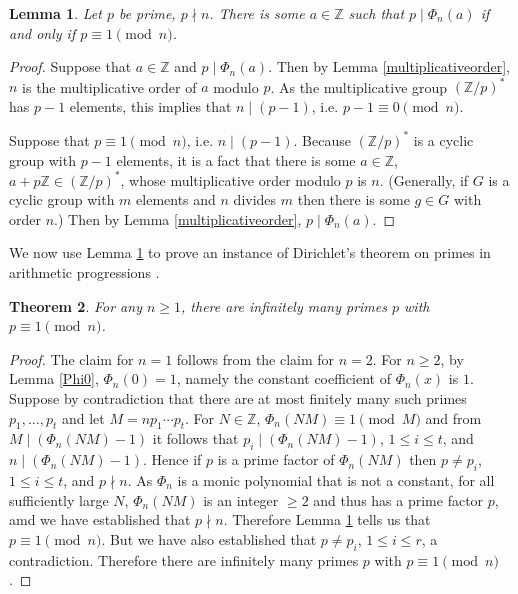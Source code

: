\documentclass{amsart}
\newtheorem{theorem}{Theorem}
\newtheorem{lemma}[theorem]{Lemma}
\theoremstyle{definition}
\begin{document}
\begin{lemma}
Let $p$ be prime, $p \nmid n$. There is some $a \in \mathbb{Z}$ such that $p \mid \Phi_n(a)$ if and only if
$p \equiv 1 \pmod{n}$. 
\label{aPhi}
\end{lemma}
\begin{proof}
Suppose that $a \in \mathbb{Z}$ and $p \mid \Phi_n(a)$. Then by Lemma \ref{multiplicativeorder},
$n$ is the multiplicative order of $a$ modulo $p$. As the multiplicative group
$(\mathbb{Z}/p)^*$ has $p-1$ elements, this implies that $n \mid (p-1)$, i.e. $p-1 \equiv 0 \pmod{n}$.

Suppose that $p \equiv 1 \pmod{n}$, i.e. $n \mid (p-1)$. 
Because $(\mathbb{Z}/p)^*$ is a cyclic group with $p-1$ elements, it is a fact that 
there is some $a \in \mathbb{Z}$, $a+p\mathbb{Z} \in (\mathbb{Z}/p)^*$, whose multiplicative order modulo
$p$ is $n$. (Generally, if $G$ is a cyclic group with $m$ elements and $n$ divides $m$ then there is some
$g \in G$ with order $n$.) Then by Lemma \ref{multiplicativeorder}, $p \mid \Phi_n(a)$.
\end{proof}


We now use Lemma \ref{aPhi} to prove an instance of Dirichlet's theorem on primes in arithmetic progressions \cite[p.~13, Lemma 2.9]{washington}.


\begin{theorem}
For any $n \geq 1$, there are infinitely many primes $p$ with $p \equiv 1 \pmod{n}$.
\end{theorem}
\begin{proof}
The claim for $n=1$ follows from the claim for $n=2$. 
For $n \geq 2$, by Lemma \ref{Phi0}, $\Phi_n(0)=1$, namely the constant coefficient of $\Phi_n(x)$ is $1$. 
Suppose by contradiction that there are at most finitely many such primes $p_1,\ldots,p_t$
and let $M = np_1\cdots p_t$. For $N \in \mathbb{Z}$, $\Phi_n(NM) \equiv 1 \pmod{M}$ and
from $M \mid (\Phi_n(NM) - 1)$ it follows that $p_i \mid (\Phi_n(NM)-1)$, $1 \leq i \leq t$, and
$n \mid (\Phi_n(NM)-1)$. Hence if $p$ is a prime factor
of $\Phi_n(NM)$ then $p \neq p_i$, $1 \leq i \leq t$, and $p \nmid n$.
As $\Phi_n$ is a  monic polynomial that is not a constant,
for all sufficiently large $N$, $\Phi_n(NM)$ is an integer $\geq 2$ and thus has a prime factor $p$, amd we have
 established that $p \nmid n$. Therefore
Lemma \ref{aPhi} tells us that $p \equiv 1 \pmod{n}$. 
But we have also established that $p \neq p_i$, $1 \leq i \leq r$, a contradiction. Therefore
there are infinitely many primes $p$ with $p \equiv 1 \pmod{n}$.
\end{proof}
\end{document}
